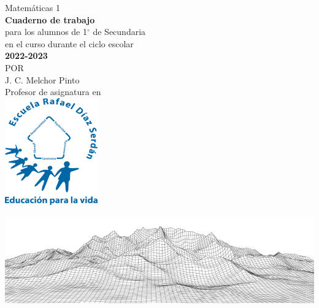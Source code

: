 \thispagestyle{empty}
\begin{center}
    \vspace{4cm}
    {\Huge Matem\'aticas 1}\\
    \vspace{1cm}
    \normalsize
    \textbf{\large Cuaderno de trabajo}\\
    para los alumnos de 1$^\circ$ de  Secundaria\\
    en el curso durante el ciclo escolar\\
    \textbf{2022-2023}\\
    \vspace{2cm}
    \small POR\\
    \Large J. C. Melchor Pinto\\[0.5em]
    \normalsize Profesor de asignatura en\\
    \vspace{2cm}
    \includegraphics[width=4cm]{../Images/LOGO_RDS_nobg}\\
    \vspace{1.8cm}
\end{center}
\includegraphics[width=1\textwidth]{../Images/cover_bg}